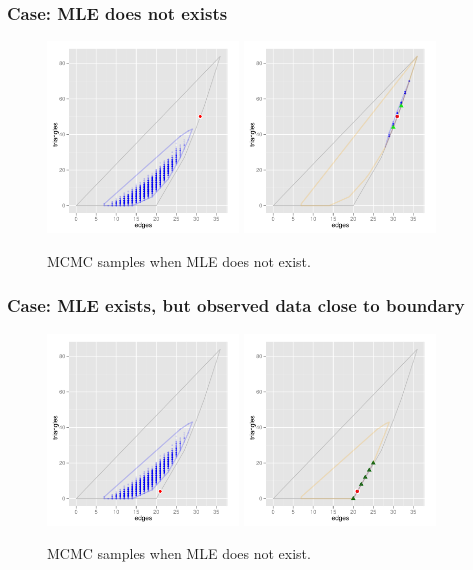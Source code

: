 \documentclass[compress, 9pt]{beamer}
\begin{document}
\frame
{
\frametitle{Case: MLE does not exists}  
\begin{figure}[h]
\centering
\includegraphics[height=2in]{MCsample-boundary}
\includegraphics[height=2in]{MCsample-77face}
\caption{MCMC samples when MLE does not exist.}
\label{F:MCsample-MLE nonexistent}
\end{figure}
}


\frame
{
\frametitle{Case: MLE exists, but observed data close to boundary}  
\begin{figure}[h]
\centering
\includegraphics[height=2in]{MCsample-problem}
\includegraphics[height=2in]{MCsample-fakeface}
\caption{MCMC samples when MLE does not exist.}
\label{F:MCsample-MLE problem}
\end{figure}
}
\end{document}
